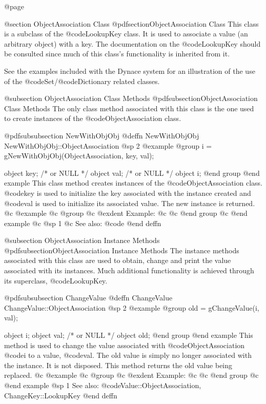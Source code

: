 @page

@section ObjectAssociation Class
@pdfsection{ObjectAssociation Class}
This class is a subclass of the @code{LookupKey} class.  It is used to
associate a value (an arbitrary object) with a key.  The documentation
on the @code{LookupKey} should be consulted since much of this class's
functionality is inherited from it.


See the examples included with the Dynace system for an illustration of the
use of the @code{Set}/@code{Dictionary} related classes.


@subsection ObjectAssociation Class Methods
@pdfsubsection{ObjectAssociation Class Methods}
The only class method associated with this class is the one used to
create instances of the @code{ObjectAssociation} class.





@pdfsubsubsection {NewWithObjObj}
@deffn {NewWithObjObj} NewWithObjObj::ObjectAssociation
@sp 2
@example
@group
i = gNewWithObjObj(ObjectAssociation, key, val);

object  key;    /*  or NULL   */
object  val;    /*  or NULL   */
object  i;
@end group
@end example
This class method creates instances of the @code{ObjectAssociation} class.
@code{key} is used to initialize the key associated with the instance
created and @code{val} is used to initialize its associated value.  The
new instance is returned.
@c @example
@c @group
@c @exdent Example:
@c 
@c @end group
@c @end example
@c @sp 1
@c See also:  @code{}
@end deffn




@subsection ObjectAssociation Instance Methods
@pdfsubsection{ObjectAssociation Instance Methods}
The instance methods associated with this class are used to obtain,
change and print the value associated with its instances.  Much
additional functionality is achieved through its superclass,
@code{LookupKey}.







@pdfsubsubsection {ChangeValue}
@deffn {ChangeValue} ChangeValue::ObjectAssociation
@sp 2
@example
@group
old = gChangeValue(i, val);

object  i;
object  val;    /*  or NULL   */
object  old;
@end group
@end example
This method is used to change the value associated with @code{ObjectAssociation}
@code{i} to a value, @code{val}.  The old value is simply no longer
associated with the instance.  It is not disposed.  This method
returns the old value being replaced.
@c @example
@c @group
@c @exdent Example:
@c 
@c @end group
@c @end example
@sp 1
See also:  @code{Value::ObjectAssociation, ChangeKey::LookupKey}
@end deffn




